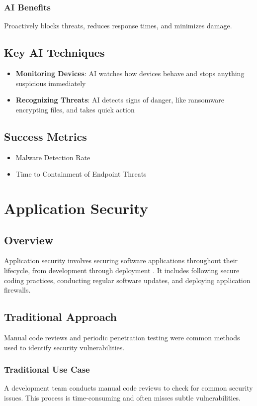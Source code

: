 \documentclass[10pt,a4paper]{article}
\begin{document}
\subsubsection{AI Benefits}
Proactively blocks threats, reduces response times, and minimizes damage.

\subsection{Key AI Techniques}
\begin{itemize}\itemsep0.5em
    \item \textbf{Monitoring Devices}: AI watches how devices behave and stops anything suspicious immediately
    \item \textbf{Recognizing Threats}: AI detects signs of danger, like ransomware encrypting files, and takes quick action
\end{itemize}

\subsection{Success Metrics}
\begin{itemize}\itemsep0.5em
    \item Malware Detection Rate
    \item Time to Containment of Endpoint Threats
\end{itemize}

\section{Application Security}
\subsection{Overview}
Application security involves securing software applications throughout their lifecycle, from development through deployment \cite{bautista2018}. It includes following secure coding practices, conducting regular software updates, and deploying application firewalls.

\subsection{Traditional Approach}
Manual code reviews and periodic penetration testing were common methods used to identify security vulnerabilities.

\subsubsection{Traditional Use Case}
A development team conducts manual code reviews to check for common security issues. This process is time-consuming and often misses subtle vulnerabilities.
\end{document}
